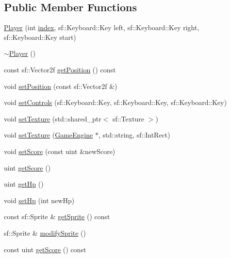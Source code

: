 \subsection*{Public Member Functions}
\begin{DoxyCompactItemize}
\item 
\mbox{\hyperlink{class_player_aa1b5d40a7f5e26c7588b64ec515d7de7}{Player}} (int \mbox{\hyperlink{class_player_a1d1f9fee5f774351292af1d0cfa7d65c}{index}}, sf\+::\+Keyboard\+::\+Key left, sf\+::\+Keyboard\+::\+Key right, sf\+::\+Keyboard\+::\+Key start)
\item 
\mbox{\hyperlink{class_player_a749d2c00e1fe0f5c2746f7505a58c062}{$\sim$\+Player}} ()
\item 
const sf\+::\+Vector2f \mbox{\hyperlink{class_player_a6599dac14c1f2ac94e9160c99376333e}{get\+Position}} () const
\item 
void \mbox{\hyperlink{class_player_a9f37a6ecb0abbea3eed1348266135879}{set\+Position}} (const sf\+::\+Vector2f \&)
\item 
void \mbox{\hyperlink{class_player_ab9820af1d231f97e0499b70ed6b34196}{set\+Controls}} (sf\+::\+Keyboard\+::\+Key, sf\+::\+Keyboard\+::\+Key, sf\+::\+Keyboard\+::\+Key)
\item 
void \mbox{\hyperlink{class_player_a7f5f3ce419bc062ab59b6f689c24a5a6}{set\+Texture}} (std\+::shared\+\_\+ptr$<$ sf\+::\+Texture $>$)
\item 
void \mbox{\hyperlink{class_player_a7d0ef1fb581ee3cc89f85c50c9c2c9ad}{set\+Texture}} (\mbox{\hyperlink{class_game_engine}{Game\+Engine}} $\ast$, std\+::string, sf\+::\+Int\+Rect)
\item 
void \mbox{\hyperlink{class_player_a8053d861a3d9d0f91fd7e35a38e7ce14}{set\+Score}} (const uint \&new\+Score)
\item 
uint \mbox{\hyperlink{class_player_a7ecb56acd6bf6d77bbc3ff7f3d8cf7d8}{get\+Score}} ()
\item 
uint \mbox{\hyperlink{class_player_ad9329ace9778fed6665610d53842f37a}{get\+Hp}} ()
\item 
void \mbox{\hyperlink{class_player_ad2543da08ed26f833dafdb9711b3ce98}{set\+Hp}} (int new\+Hp)
\item 
const sf\+::\+Sprite \& \mbox{\hyperlink{class_player_aa84e6c6cc5f2f263b9ff9841286d8c42}{get\+Sprite}} () const
\item 
sf\+::\+Sprite \& \mbox{\hyperlink{class_player_af61ca52f651c2be22d1606a031d919eb}{modify\+Sprite}} ()
\item 
const uint \mbox{\hyperlink{class_player_a5e084d1d883eeade8a73df72cdd855be}{get\+Score}} () const

\end{DoxyCompactItemize}
